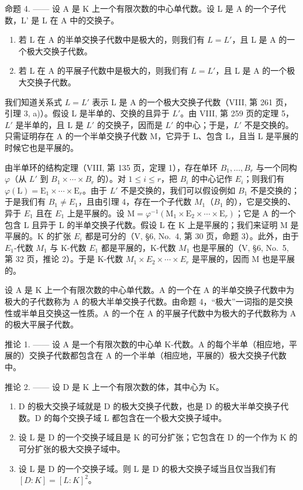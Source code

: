 命题 4. —— 设 A 是 K 上一个有限次数的中心单代数。设 L 是 A 的一个子代数，L' 是 L 在 A 中的交换子。

\begin{enumerate}
\def\labelenumi{\alph{enumi})}
\item
  若 L 在 A 的半单交换子代数中是极大的，则我们有 \(L = L'\)，且 L 是 A 的一个极大交换子代数。
\item
  若 L 在 A 的平展子代数中是极大的，则我们有 \(L = L'\)，且 L 是 A 的一个极大交换子代数。
\end{enumerate}

我们知道关系式 \(L = L'\) 表示 L 是 A 的一个极大交换子代数（VIII, 第 261 页，引理 3, a)）。假设 L 是半单的、交换的且异于 \(L'\)。由 VIII, 第 259 页的定理 5，\(L'\) 是半单的，且 L 是 \(L'\) 的交换子，因而是 \(L'\) 的中心；于是，\(L'\) 不是交换的。只需证明存在 A 的一个半单交换子代数 M，它异于 L、包含 L，且当 L 是平展的时候它也是平展的。

由半单环的结构定理（VIII, 第 135 页，定理 1），存在单环 \(B_{1},\ldots,B_{r}\) 与一个同构 \(\varphi\)（从 \(L'\) 到 \(B_{1}\times\cdots\times B_{r}\) 的）。对 \(1\leqslant i\leqslant r\)，把 \(B_{i}\) 的中心记作 \(E_{i}\)；则我们有 \(\varphi(\mathrm{L})=\mathrm{E}_{1}\times\cdots\times\mathrm{E}_{r}\)。由于 \(L'\) 不是交换的，我们可以假设例如 \(B_{1}\) 不是交换的；于是我们有 \(B_{1}\neq E_{1}\)，且由引理 4，存在一个子代数 \(M_{1}\)（\(B_{1}\) 的），它是交换的、异于 \(E_{1}\) 且在 \(E_{1}\) 上是平展的。设 \(\mathrm{M} = \varphi^{-1}(\mathrm{M}_{1} \times \mathrm{E}_{2} \times \cdots \times \mathrm{E}_{r})\)；它是 A 的一个包含 L 且异于 L 的半单交换子代数。假设 L 在 K 上是平展的；我们来证明 M 是平展的。K 的扩张 \(E_{i}\) 都是可分的（V, §6, No.~4, 第 30 页，命题 3）。此外，由于 \(E_{1}\)-代数 \(M_{1}\) 与 K-代数 \(E_{1}\) 都是平展的，K-代数 \(M_{1}\) 也是平展的（V, §6, No.~5, 第 32 页，推论 2）。于是 K-代数 \(M_{1} \times E_{2} \times \cdots \times E_{r}\) 是平展的，因而 M 也是平展的。

设 A 是 K 上一个有限次数的中心单代数。A 的一个在 A 的半单交换子代数中为极大的子代数称为 A 的极大半单交换子代数。由命题 4，“极大”一词指的是交换性或半单且交换这一性质。A 的一个在 A 的平展子代数中为极大的子代数称为 A 的极大平展子代数。

推论 1. —— 设 A 是一个有限次数的中心单 K-代数。A 的每个半单（相应地，平展的）交换子代数都包含在 A 的一个半单（相应地，平展的）极大交换子代数中。

推论 2. —— 设 D 是 K 上一个有限次数的体，其中心为 K。

\begin{enumerate}
\def\labelenumi{\alph{enumi})}
\item
  D 的极大交换子域就是 D 的极大交换子代数，也是 D 的极大半单交换子代数。D 的每个交换子域 L 都包含在一个极大交换子域中。
\item
  设 L 是 D 的一个交换子域且是 K 的可分扩张；它包含在 D 的一个作为 K 的可分扩张的极大交换子域中。
\item
  设 L 是 D 的一个交换子域。则 L 是 D 的极大交换子域当且仅当我们有 \([D:K]=[L:K]^{2}\)。
\end{enumerate}


